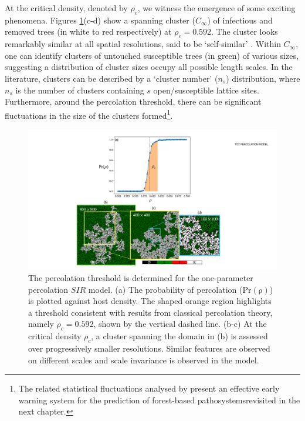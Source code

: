At the critical density, denoted by $\rho_c$, we witness the emergence of some exciting phenomena.
Figures \ref{fig:ch3-perc}(c-d) show a spanning cluster ($C_\infty$) of infectious and removed trees (in white to red respectively) at $\rho_c=0.592$.
The cluster looks remarkably similar at all spatial resolutions, said to be `self-similar' \cite{Kapitulnik_1983}.
Within $C_\infty$, one can identify clusters of untouched susceptible trees (in green) of various sizes, suggesting a distribution of cluster sizes occupy all possible length scales.
In the literature, clusters can be described by a `cluster number' ($n_s$) distribution, where $n_s$ is the number of clusters containing $s$ open/susceptible lattice sites.
Furthermore, around the percolation threshold, there can be significant fluctuations in the size of the clusters formed\footnote{
The related statistical fluctuations analysed by \cite{OROZCOFUENTES201912}
present an effective early warning system for the prediction of forest-based pathosystems\textemdash revisited in the next chapter.
}.

\begin{figure}
    \centering
    \includegraphics[scale=0.4]{chapter3/figures/figure2-1param-perc-threshold.pdf}
    \caption{The percolation threshold is determined for the one-parameter percolation $SIR$ model.
            (a) The probability of percolation ($\mathrm{Pr(\rho)}$) is plotted against host density.
            The shaped orange region highlights a threshold consistent with results from classical percolation theory, 
            namely $\rho_c = 0.592$, shown by the vertical dashed line. 
            (b-c) At the critical density $\rho_c$, a cluster spanning the domain in (b) is assessed over progressively smaller resolutions.
            Similar features are observed on different scales and scale invariance is observed in the model.
            }
    \label{fig:ch3-perc} %
\end{figure}

